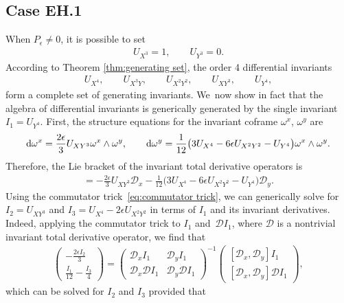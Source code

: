 \documentclass[10pt,a4paper]{amsart}
\numberwithin{equation}{section}
\newcommand{\D}{\mathcal{D}}
\begin{document}
\subsection{Case EH.1}

When $P_\epsilon \neq 0$, it is possible to set
\begin{gather*}
U_{X^3} =1,\qquad U_{Y^3}=0.
\end{gather*}
According to Theorem \ref{thm:generating set}, the order 4 differential invariants
\begin{gather*}
U_{X^4}, \qquad U_{X^3Y}, \qquad U_{X^2Y^2}, \qquad U_{XY^3}, \qquad U_{Y^4},
\end{gather*}
form a complete set of generating invariants. We~now show in fact that the algebra of differential invariants is generically generated by the single invariant $I_1= U_{Y^4}$. First, the structure equations for the invariant coframe $\omega^x$, $\omega^y$ are
\begin{gather*}
{\rm d}\omega^x = \frac{2\epsilon}{3} U_{XY^3} \omega^x\wedge\omega^y,\qquad
{\rm d}\omega^y = \frac{1}{12}\big(3U_{X^4}-6\epsilon U_{X^2Y^2} - U_{Y^4}\big) \omega^x\wedge\omega^y.
\end{gather*}
Therefore, the Lie bracket of the invariant total derivative operators is
\begin{gather*}
[\D_x,\D_y] = -\frac{2\epsilon}{3} U_{XY^3} \D_x - \frac{1}{12}\big(3U_{X^4}-6\epsilon U_{X^2Y^2} - U_{Y^4}\big) \D_y.
\end{gather*}
Using the commutator trick~\eqref{eq:commutator trick}, we can generically solve for $I_2=U_{XY^3}$ and $I_3=U_{X^4}-2\epsilon U_{X^2Y^2}$ in terms of $I_1$ and its invariant derivatives. Indeed, applying the commutator trick to $I_1$ and~$\D I_1$, where $\D$ is a nontrivial invariant total derivative operator, we find that
%
\begin{gather*}
\begin{pmatrix}
-\frac{2\epsilon I_2}{3} \\[.5ex]
\frac{I_1}{12}-\frac{I_3}{4}
\end{pmatrix}
=
\begin{pmatrix}
\D_x I_1 & \D_y I_1 \\[.5ex]
\D_x\D I_1 & \D_y\D I_1
\end{pmatrix}^{-1}
\begin{pmatrix}
[\D_x,\D_y]I_1 \\[.5ex]
[\D_x,\D_y]\D I_1
\end{pmatrix},
\end{gather*}
which can be solved for $I_2$ and $I_3$ provided that
\end{document}
